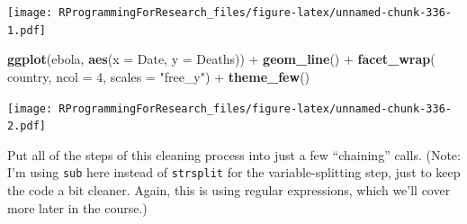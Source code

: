 \documentclass[]{book}
\makeatletter
\newenvironment{Shaded}{\begin{snugshade}}{\end{snugshade}}
\newcommand{\KeywordTok}[1]{\textcolor[rgb]{0.13,0.29,0.53}{\textbf{{#1}}}}
\newcommand{\DataTypeTok}[1]{\textcolor[rgb]{0.13,0.29,0.53}{{#1}}}
\newcommand{\DecValTok}[1]{\textcolor[rgb]{0.00,0.00,0.81}{{#1}}}
\newcommand{\StringTok}[1]{\textcolor[rgb]{0.31,0.60,0.02}{{#1}}}
\newcommand{\OtherTok}[1]{\textcolor[rgb]{0.56,0.35,0.01}{{#1}}}
\newcommand{\NormalTok}[1]{{#1}}
\newenvironment{kframe}{%
\medskip{}
\setlength{\fboxsep}{.8em}
 \def\at@end@of@kframe{}%
 \ifinner\ifhmode%
  \def\at@end@of@kframe{\end{minipage}}%
  \begin{minipage}{\columnwidth}%
 \fi\fi%
 \def\FrameCommand##1{\hskip\@totalleftmargin \hskip-\fboxsep
 \colorbox{shadecolor}{##1}\hskip-\fboxsep
     \hskip-\linewidth \hskip-\@totalleftmargin \hskip\columnwidth}%
 \MakeFramed {\advance\hsize-\width
   \@totalleftmargin\z@ \linewidth\hsize
   \@setminipage}}%
 {\par\unskip\endMakeFramed%
 \at@end@of@kframe}
\renewenvironment{Shaded}{\begin{kframe}}{\end{kframe}}
\makeatother
\begin{document}
\texttt{[image: RProgrammingForResearch\_files/figure-latex/unnamed-chunk-336-1.pdf]}

\begin{Shaded}
\begin{Highlighting}[]
\KeywordTok{ggplot}\NormalTok{(ebola, }\KeywordTok{aes}\NormalTok{(}\DataTypeTok{x =} \NormalTok{Date, }\DataTypeTok{y =} \NormalTok{Deaths)) +}\StringTok{ }
\StringTok{        }\KeywordTok{geom_line}\NormalTok{() +}\StringTok{ }
\StringTok{        }\KeywordTok{facet_wrap}\NormalTok{(~}\StringTok{ }\NormalTok{country, }\DataTypeTok{ncol =} \DecValTok{4}\NormalTok{, }\DataTypeTok{scales =} \StringTok{"free_y"}\NormalTok{) +}\StringTok{ }
\StringTok{        }\KeywordTok{theme_few}\NormalTok{()}
\end{Highlighting}
\end{Shaded}

\texttt{[image: RProgrammingForResearch\_files/figure-latex/unnamed-chunk-336-2.pdf]}

Put all of the steps of this cleaning process into just a few
``chaining'' calls. (Note: I'm using \texttt{sub} here instead of
\texttt{strsplit} for the variable-splitting step, just to keep the code
a bit cleaner. Again, this is using regular expressions, which we'll
cover more later in the course.)

\begin{Shaded}
\end{Shaded}
\end{document}
